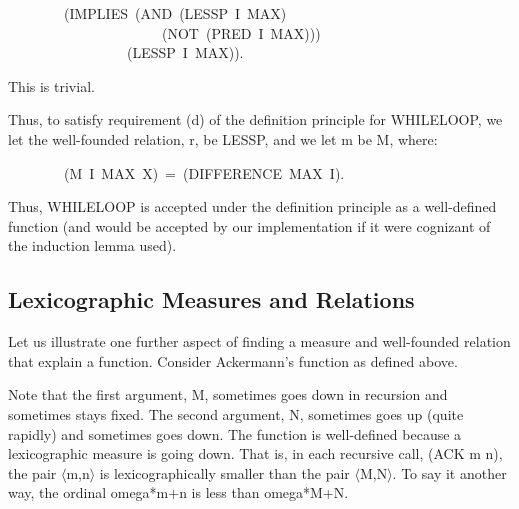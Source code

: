 \documentclass[10pt]{book}
\newenvironment{pubasis}{\begin{flushleft}}{\end{flushleft}}
\begin{document}
\begin{pubasis}
~~~~~~~~(IMPLIES~(AND~(LESSP~I~MAX)\\
~~~~~~~~~~~~~~~~~~~~~~(NOT~(PRED~I~MAX)))\\
~~~~~~~~~~~~~~~~~(LESSP~I~MAX)).\\
\end{pubasis}
This is trivial.

Thus, to satisfy requirement (d)
of the definition principle for WHILELOOP, we let the well-founded relation, r, be
LESSP, and we let m be M, where:

\begin{pubasis}
~~~~~~~~(M~I~MAX~X)~=~(DIFFERENCE~MAX~I).\\
\end{pubasis}
Thus, WHILELOOP is accepted under the definition principle as a well-defined
function (and would be accepted by our implementation if it were cognizant
of the induction lemma used).

\subsection{Lexicographic Measures and Relations}
Let us illustrate one further aspect of finding a measure and well-founded relation that
explain a function.  Consider Ackermann's function as defined
above.

Note that the first argument, M, sometimes goes down in recursion and sometimes
stays fixed.  The second argument, N, sometimes goes up (quite rapidly) and
sometimes goes down.  The function is well-defined because
a lexicographic measure is going down.  That is, in each recursive
call, (ACK m n), the pair $\langle$m,n$\rangle$ is lexicographically smaller than
the pair $\langle$M,N$\rangle$.
To say it another way, the ordinal omega*m+n is less than omega*M+N.
\end{document}
